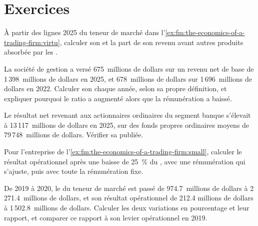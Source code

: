 \section{Exercices}

\begin{exercise}[$\star$]\label{exo:fm:the-economics-of-a-trading-firm:1}
À partir des lignes 2025 du teneur de marché dans l'\cref{ex:fm:the-economics-of-a-trading-firm:virtu}, calculer son  et la part de son
revenu avant autres produits absorbée par les .
\end{exercise}

\begin{exercise}[$\star$]\label{exo:fm:the-economics-of-a-trading-firm:2}
La société de gestion a versé 675~millions de dollars sur un revenu net de base de 1\,398~millions de dollars en 2025, et 678~millions de dollars sur 1\,696~millions de dollars en 2022. Calculer son
 chaque année, selon sa propre définition, et expliquer pourquoi le ratio a augmenté alors que la rémunération a baissé.
\end{exercise}

\begin{exercise}[$\star$]\label{exo:fm:the-economics-of-a-trading-firm:3}
Le résultat net revenant aux actionnaires ordinaires du segment banque s'élevait à 13\,117~millions de dollars en 2025, sur des fonds propres ordinaires moyens de 79\,748~millions de dollars. Vérifier sa  publiée.
\end{exercise}

\begin{exercise}[$\star\star$]\label{exo:fm:the-economics-of-a-trading-firm:4}
Pour l'entreprise de l'\cref{ex:fm:the-economics-of-a-trading-firm:small}, calculer le résultat opérationnel après une baisse de 25~\% du , avec une rémunération
qui s'ajuste, puis avec toute la rémunération fixe.
\end{exercise}

\begin{exercise}[$\star\star$]\label{exo:fm:the-economics-of-a-trading-firm:5}
De 2019 à 2020, le  du teneur de marché est passé de 974.7~millions de dollars à 2\,271.4~millions de dollars, et son résultat opérationnel de 212.4
millions de dollars à 1\,502.8~millions de dollars. Calculer les deux variations en pourcentage et leur rapport, et comparer ce rapport à son levier opérationnel en 2019.
\end{exercise}

